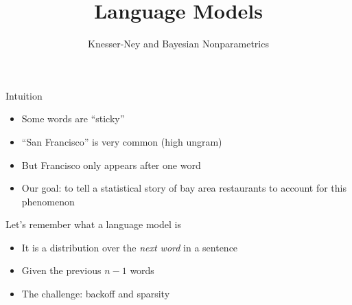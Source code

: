 \documentclass[compress]{beamer}
\title{Language Models}
\date{Knesser-Ney and Bayesian Nonparametrics}
\begin{document}
\frame{\titlepage
}



\begin{frame}{Intuition}

  \begin{itemize}
    \item Some words are ``sticky''
    \item ``San Francisco'' is very common (high ungram)
    \item But Francisco only appears after one word
      \pause
     \item Our goal: to tell a statistical story of bay area
       restaurants to account for this phenomenon
  \end{itemize}

\end{frame}


\begin{frame}{Let's remember what a language model is}
	\begin{itemize}
		\item It is a distribution over the \emph{next word} in a sentence
		\item Given the previous $n-1$ words
		\pause
		\item The challenge: backoff and sparsity
	\end{itemize}
\end{frame}
\end{document}
